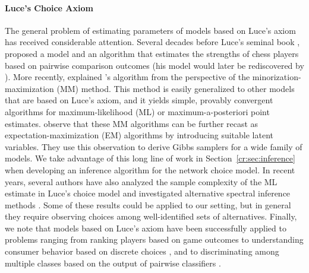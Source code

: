 \paragraph{Luce's Choice Axiom}
The general problem of estimating parameters of models based on Luce's axiom has received considerable attention.
Several decades before Luce's seminal book \citep{luce1959individual}, \citet{zermelo1928berechnung} proposed a model and an algorithm that estimates the strengths of chess players based on pairwise comparison outcomes (his model would later be rediscovered by \citet{bradley1952rank}).
More recently, \citet{hunter2004mm} explained \citeauthor{zermelo1928berechnung}'s algorithm from the perspective of the minorization-maximization (MM) method.
This method is easily generalized to other models that are based on Luce's axiom, and it yields simple, provably convergent algorithms for maximum-likelihood (ML) or maximum-a-posteriori point estimates.
\citet{caron2012efficient} observe that these MM algorithms can be further recast as expectation-maximization (EM) algorithms by introducing suitable latent variables.
They use this observation to derive Gibbs samplers for a wide family of models.
We take advantage of this long line of work in Section~\ref{cr:sec:inference} when developing an inference algorithm for the network choice model.
In recent years, several authors have also analyzed the sample complexity of the ML estimate in Luce's choice model \citep{hajek2014minimax, vojnovic2016parameter} and investigated alternative spectral inference methods \citep{negahban2012iterative, azari2013generalized, maystre2015fast}.
Some of these results could be applied to our setting, but in general they require observing choices among well-identified sets of alternatives.
Finally, we note that models based on Luce's axiom have been successfully applied to problems ranging from ranking players based on game outcomes \citep{zermelo1928berechnung, elo1978rating} to understanding consumer behavior based on discrete choices \citep{mcfadden1973conditional}, and to discriminating among multiple classes based on the output of pairwise classifiers \citep{hastie1998classification}.

